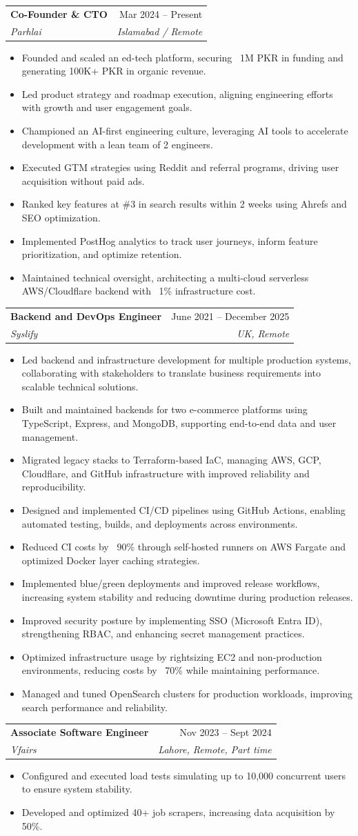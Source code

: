 \documentclass[letterpaper,10pt]{article}
\makeatletter
\newcommand{\resumeItem}[1]{
  \item\small{{#1 \vspace{-3pt}}}
}
\newcommand{\resumeSubheading}[4]{
  \vspace{-4pt}\item
  \begin{tabular*}{0.97\textwidth}[t]{l@{\extracolsep{\fill}}r}
    \small\textbf{#1} & #2 \\
    \textit{\small#3} & \textit{\small #4} \\
  \end{tabular*}\vspace{-7pt}
}
\newcommand{\resumeItemListStart}{\begin{itemize}}
\newcommand{\resumeItemListEnd}{\end{itemize}\vspace{-7pt}}
\makeatother
\begin{document}
\resumeSubheading
{Co-Founder \& CTO}{Mar 2024 -- Present}
{Parhlai}{Islamabad / Remote}
\resumeItemListStart
\resumeItem{Founded and scaled an ed-tech platform, securing ~1M PKR in funding and generating 100K+ PKR in organic revenue.}
\resumeItem{Led product strategy and roadmap execution, aligning engineering efforts with growth and user engagement goals.}
\resumeItem{Championed an AI-first engineering culture, leveraging AI tools to accelerate development with a lean team of 2 engineers.}
\resumeItem{Executed GTM strategies using Reddit and referral programs, driving user acquisition without paid ads.}
\resumeItem{Ranked key features at \#3 in search results within 2 weeks using Ahrefs and SEO optimization.}
\resumeItem{Implemented PostHog analytics to track user journeys, inform feature prioritization, and optimize retention.}
\resumeItem{Maintained technical oversight, architecting a multi-cloud serverless AWS/Cloudflare backend with ~1\% infrastructure cost.}
\resumeItemListEnd


\resumeSubheading
{Backend and DevOps Engineer}{June 2021 -- December 2025}
{Syslify}{UK, Remote}
\resumeItemListStart
\resumeItem{Led backend and infrastructure development for multiple production systems, collaborating with stakeholders to translate business requirements into scalable technical solutions.}
\resumeItem{Built and maintained backends for two e-commerce platforms using TypeScript, Express, and MongoDB, supporting end-to-end data and user management.}
\resumeItem{Migrated legacy stacks to Terraform-based IaC, managing AWS, GCP, Cloudflare, and GitHub infrastructure with improved reliability and reproducibility.}
\resumeItem{Designed and implemented CI/CD pipelines using GitHub Actions, enabling automated testing, builds, and deployments across environments.}
\resumeItem{Reduced CI costs by ~90\% through self-hosted runners on AWS Fargate and optimized Docker layer caching strategies.}
\resumeItem{Implemented blue/green deployments and improved release workflows, increasing system stability and reducing downtime during production releases.}
\resumeItem{Improved security posture by implementing SSO (Microsoft Entra ID), strengthening RBAC, and enhancing secret management practices.}
\resumeItem{Optimized infrastructure usage by rightsizing EC2 and non-production environments, reducing costs by ~70\% while maintaining performance.}
\resumeItem{Managed and tuned OpenSearch clusters for production workloads, improving search performance and reliability.}
\resumeItemListEnd

\resumeSubheading
{Associate Software Engineer}{Nov 2023 -- Sept 2024}
{Vfairs}{Lahore, Remote, Part time}
\resumeItemListStart
\resumeItem{Configured and executed load tests simulating up to 10,000 concurrent users to ensure system stability.}
\resumeItem{Developed and optimized 40+ job scrapers, increasing data acquisition by 50\%.}
\resumeItemListEnd
\end{document}
